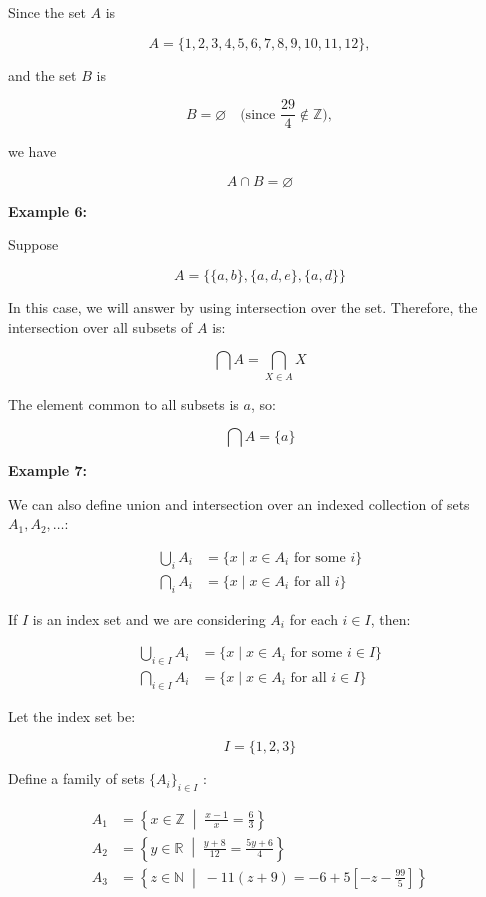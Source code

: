 \documentclass[12pt,a4paper,openany]{article}
\begin{document}
Since the set $A$ is

\[
A = \{1, 2, 3, 4, 5, 6, 7, 8, 9, 10, 11, 12\},
\]

and the set $B$ is

\[
B = \varnothing \quad \text{(since $\frac{29}{4} \notin \mathbb{Z}$)},
\]

we have

\[
\boxed{A \cap B = \varnothing}
\]

\textbf{Example 6:}

Suppose

$$
A = \{ \{a,b\}, \{a,d,e\}, \{a,d\} \}
$$

In this case, we will answer by using intersection over the set. Therefore, the intersection over all subsets of $A$ is:

$$
\displaystyle\bigcap A = \bigcap_{X \in A} X
$$

The element common to all subsets is $a$, so:

$$\boxed{
\displaystyle\bigcap A = \{a\}
}$$

\textbf{Example 7:}

We can also define union and intersection over an indexed collection of sets $A_1, A_2, \dots$:

$$
\begin{aligned}
\bigcup_i A_i &= \{x \mid x \in A_i \text{ for some } i\} \\
\bigcap_i A_i &= \{x \mid x \in A_i \text{ for all } i\}
\end{aligned}
$$

If $I$ is an index set and we are considering $A_i$ for each $i \in I$, then:

$$
\begin{aligned}
\bigcup_{i \in I} A_i &= \{x \mid x \in A_i \text{ for some } i \in I\} \\
\bigcap_{i \in I} A_i &= \{x \mid x \in A_i \text{ for all } i \in I\}
\end{aligned}
$$

Let the index set be:

$$
I = \{1, 2, 3\}
$$

Define a family of sets $\{A_i\}_{i \in I}$ :

$$ 
\begin{aligned} 
A_1 &= \displaystyle \left\{ x \in \mathbb{Z} \;\middle|\; \frac{x-1}{x} = \frac{6}{3} \right\} \\ 
A_2 &= \displaystyle \left\{ y \in \mathbb{R} \;\middle|\; \frac{y+8}{12} = \frac{5y+6}{4} \right\} \\ 
A_3 &= \displaystyle \left\{ z \in \mathbb{N} \;\middle|\; -11(z+9) = -6 + 5\left[-z - \frac{99}{5}\right] \right\} 
\end{aligned} 
$$
\end{document}
